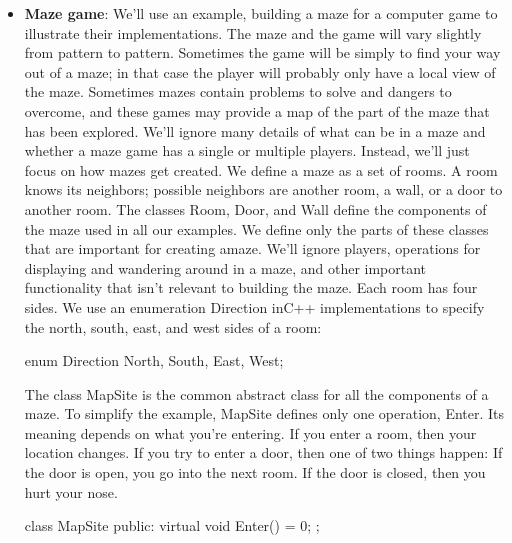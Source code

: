 \documentclass{report}
\begin{document}
\begin{itemize}
            \bigbreak \noindent 
            Because the creational patterns are closely related, we'll study all five of them together to highlight their similarities and differences.W
        \item \textbf{Maze game}: We'll use an example, building a maze for a computer game to illustrate their implementations. The maze and the game will vary slightly from pattern to pattern. Sometimes the game will be simply to find your way out of a maze; in that case the player will probably only have a local view of the maze. Sometimes mazes contain problems to solve and dangers to overcome, and these games may provide a map of the part of the maze that has been explored.
            \bigbreak \noindent 
            We'll ignore many details of what can be in a maze and whether a maze game has a single or multiple players. Instead, we'll just focus on how mazes get created. We define a maze as a set of rooms. A room knows its neighbors; possible neighbors are another room, a wall, or a door to another room.
            \bigbreak \noindent 
            The classes Room, Door, and Wall define the components of the maze used in all our examples. We define only the parts of these classes that are important for creating amaze. We'll ignore players, operations for displaying and wandering around in a maze, and other important functionality that isn't relevant to building the maze.
            \bigbreak \noindent 
            \bigbreak \noindent 
            Each room has four sides. We use an enumeration Direction inC++ implementations to specify the north, south, east, and west sides of a room:
            \bigbreak \noindent 
            \begin{cppcode}
                enum Direction {North, South, East, West};
            \end{cppcode}
            \bigbreak \noindent 
            The class MapSite is the common abstract class for all the components of a maze. To simplify the example, MapSite defines only one operation, Enter. Its meaning depends on what you're entering. If you enter a room, then your location changes. If you try to enter a door, then one of two things happen: If the door is open, you go into the next room. If the door is closed, then you hurt your nose.
            \bigbreak \noindent 
            \begin{cppcode}
                class MapSite {
                public:
                    virtual void Enter() = 0;
                };
            \end{cppcode}

\end{itemize}
\end{document}
